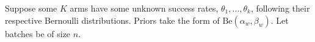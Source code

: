 \documentclass[xcolor={table}]{beamer}
\begin{document}
\note{
\scriptsize \singlespacing

}
\begin{frame}[label=cats]{}
\begin{framed}
\begin{minipage}{\textwidth}
\tiny
\vspace{-2.5 em}

\begin{algorithm}[H]
\fontsize{5}{6}\selectfont
    \caption{Control-augmented Thompson sampling}
    \label{algg:cats}
     Suppose some $K$ arms have some unknown success rates, $\theta_1, \dots, \theta_k$, following their respective Bernoulli distributions. Priors take the form of $\textrm{Be}(\alpha_w, \beta_w)$. Let batches be of size $n$.\\
    \begin{algorithmic}[1]


\end{algorithmic}
\end{algorithm}
\end{minipage}
\end{framed}
\end{frame}
\end{document}
